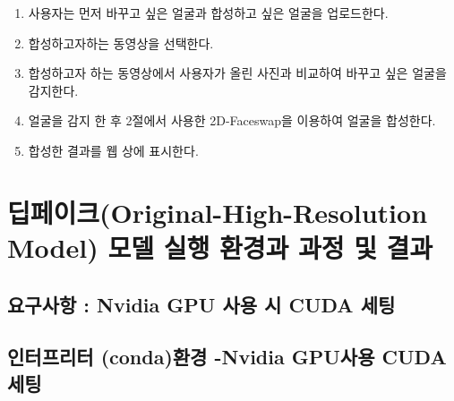 \documentclass{oblivoir}
\begin{document}
\begin{enumerate}
    \item 사용자는 먼저 바꾸고 싶은 얼굴과 합성하고 싶은 얼굴을 업로드한다.
    \item 합성하고자하는 동영상을 선택한다.
    \item 합성하고자 하는 동영상에서 사용자가 올린 사진과 비교하여 바꾸고 싶은 얼굴을 감지한다.
    \item 얼굴을 감지 한 후 2절에서 사용한 2D-Faceswap을 이용하여 얼굴을 합성한다.
    \item 합성한 결과를 웹 상에 표시한다.
\end{enumerate}

\section{딥페이크(Original-High-Resolution Model) 모델 실행 환경과 과정 및 결과}

\subsection{요구사항 : Nvidia GPU 사용 시 CUDA 세팅}


\subsection{인터프리터 (conda)환경 -Nvidia GPU사용 CUDA 세팅}
\end{document}
